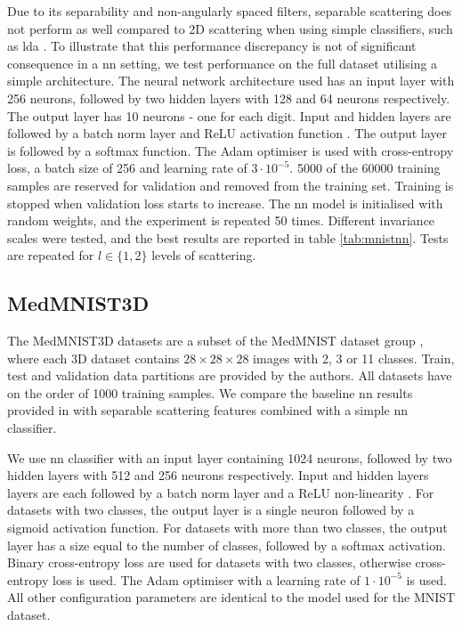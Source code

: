 Due to its separability and non-angularly spaced filters, separable scattering does not perform as well compared to 2D scattering when using simple classifiers, such as \ac{lda} \citep{lda}. To illustrate that this performance discrepancy is not of significant consequence in a \ac{nn} setting, we test performance on the full dataset utilising a simple architecture. The neural network architecture used has an input layer with 256 neurons, followed by two hidden layers with 128 and 64 neurons respectively. The output layer has 10 neurons - one for each digit. Input and hidden layers are followed by a batch norm layer \citep{batchnorm} and ReLU activation function \citep{relu}. The output layer is followed by a softmax function. The Adam optimiser \citep{adam} is used with cross-entropy loss, a batch size of 256 and learning rate of $3 \cdot 10^{-5}$. 5000 of the 60000 training samples are reserved for validation and removed from the training set. Training is stopped when validation loss starts to increase. The \ac{nn} model is initialised with random weights, and the experiment is repeated 50 times. Different invariance scales were tested, and the best results are reported in table \ref{tab:mnistnn}. Tests are repeated for $l \in \{1, 2\}$ levels of scattering.





\subsection{MedMNIST3D}


The MedMNIST3D datasets are a subset of the MedMNIST dataset group \citep{medmnist}, where each 3D dataset contains $28\times 28 \times 28$ images with 2, 3 or 11 classes. Train, test and validation data partitions are provided by the authors. All datasets have on the order of 1000 training samples. We compare the baseline \ac{nn} results provided in \citep{medmnist} with separable scattering features combined with a simple \ac{nn} classifier.

We use \ac{nn} classifier with an input layer containing 1024 neurons, followed by two hidden layers with 512 and 256 neurons respectively. Input and hidden layers layers are each followed by a batch norm layer \citep{batchnorm} and a ReLU non-linearity \citep{relu}. For datasets with two classes, the output layer is a single neuron followed by a sigmoid activation function. For datasets with more than two classes, the output layer has a size equal to the number of classes, followed by a softmax activation. Binary cross-entropy loss are used for datasets with two classes, otherwise cross-entropy loss is used. The Adam optimiser \citep{adam} with a learning rate of $1 \cdot 10^{-5}$ is used. All other configuration parameters are identical to the model used for the MNIST dataset.

